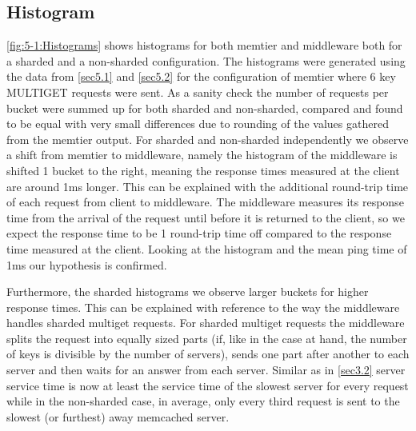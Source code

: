 \documentclass[11pt,a4paper]{article}
\begin{document}
\subsection{Histogram}
\autoref{fig:5-1:Histograms} shows histograms for both memtier and middleware both for a sharded and a non-sharded configuration. The histograms were generated using the data from \autoref{sec5.1} and \autoref{sec5.2} for the configuration of memtier where 6 key MULTIGET requests were sent. As a sanity check the number of requests per bucket were summed up for both sharded and non-sharded, compared and found to be equal with very small differences due to rounding of the values gathered from the memtier output.
For sharded and non-sharded independently we observe a shift from memtier to middleware, namely the histogram of the middleware is shifted 1 bucket to the right, meaning the response times measured at the client are around 1ms longer. This can be explained with the additional round-trip time of each request from client to middleware. The middleware measures its response time from the arrival of the request until before it is returned to the client, so we expect the response time to be 1 round-trip time off compared to the response time measured at the client. Looking at the histogram and the mean ping time of 1ms our hypothesis is confirmed.

Furthermore, the sharded histograms we observe larger buckets for higher response times. This can be explained with reference to the way the middleware handles sharded multiget requests. For sharded multiget requests the middleware splits the request into equally sized parts (if, like in the case at hand, the number of keys is divisible by the number of servers), sends one part after another to each server and then waits for an answer from each server. Similar as in \autoref{sec3.2} server service time is now at least the service time of the slowest server for every request while in the non-sharded case, in average, only every third request is sent to the slowest (or furthest) away memcached server. 
\end{document}
